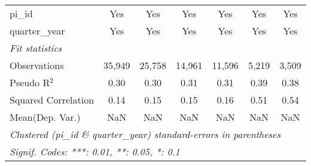 \begin{tabular}{lcccccc}
   pi\_id                                                     & Yes           & Yes           & Yes           & Yes           & Yes           & Yes\\  
   quarter\_year                                              & Yes           & Yes           & Yes           & Yes           & Yes           & Yes\\  
   \midrule
   \emph{Fit statistics}\\
   Observations                                               & 35,949        & 25,758        & 14,961        & 11,596        & 5,219         & 3,509\\  
   Pseudo R$^2$                                               & 0.30          & 0.30          & 0.31          & 0.31          & 0.39          & 0.38\\  
   Squared Correlation                                        & 0.14          & 0.15          & 0.15          & 0.16          & 0.51          & 0.54\\  
Mean(Dep. Var.) & NaN & NaN & NaN & NaN & NaN & NaN \\
   \midrule \midrule
   \multicolumn{7}{l}{\emph{Clustered (pi\_id \& quarter\_year) standard-errors in parentheses}}\\
   \multicolumn{7}{l}{\emph{Signif. Codes: ***: 0.01, **: 0.05, *: 0.1}}\\
\end{tabular}
\par\endgroup
